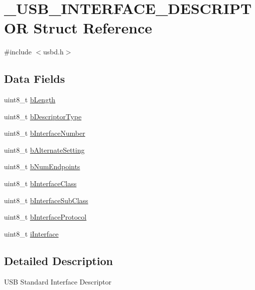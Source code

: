 \hypertarget{struct__USB__INTERFACE__DESCRIPTOR}{\section{\-\_\-\-U\-S\-B\-\_\-\-I\-N\-T\-E\-R\-F\-A\-C\-E\-\_\-\-D\-E\-S\-C\-R\-I\-P\-T\-O\-R Struct Reference}
\label{struct__USB__INTERFACE__DESCRIPTOR}
}


{\ttfamily \#include $<$usbd.\-h$>$}

\subsection*{Data Fields}
\begin{DoxyCompactItemize}
\item 
uint8\-\_\-t \hyperlink{struct__USB__INTERFACE__DESCRIPTOR_a16fbd548f47d86ea2c045da5a091ed79}{b\-Length}
\item 
uint8\-\_\-t \hyperlink{struct__USB__INTERFACE__DESCRIPTOR_a37b3f11033507a50c072cefb0000a8f4}{b\-Descriptor\-Type}
\item 
uint8\-\_\-t \hyperlink{struct__USB__INTERFACE__DESCRIPTOR_a1cd05be188c8776aaa33029e0e7e8c32}{b\-Interface\-Number}
\item 
uint8\-\_\-t \hyperlink{struct__USB__INTERFACE__DESCRIPTOR_aa596036a18b317c3dbeb9ea417938a43}{b\-Alternate\-Setting}
\item 
uint8\-\_\-t \hyperlink{struct__USB__INTERFACE__DESCRIPTOR_a9972081626557a77abd11258cc75684b}{b\-Num\-Endpoints}
\item 
uint8\-\_\-t \hyperlink{struct__USB__INTERFACE__DESCRIPTOR_a21d6fc8a0a868dc4061084f9d0f62684}{b\-Interface\-Class}
\item 
uint8\-\_\-t \hyperlink{struct__USB__INTERFACE__DESCRIPTOR_af88328ec7f751751f3397df1c4c032b2}{b\-Interface\-Sub\-Class}
\item 
uint8\-\_\-t \hyperlink{struct__USB__INTERFACE__DESCRIPTOR_a12f09e3be7c323bbd776f75af515ec7f}{b\-Interface\-Protocol}
\item 
uint8\-\_\-t \hyperlink{struct__USB__INTERFACE__DESCRIPTOR_a69b79c8ff54fe5c4ce9e0517923332a5}{i\-Interface}
\end{DoxyCompactItemize}


\subsection{Detailed Description}
U\-S\-B Standard Interface Descriptor 

